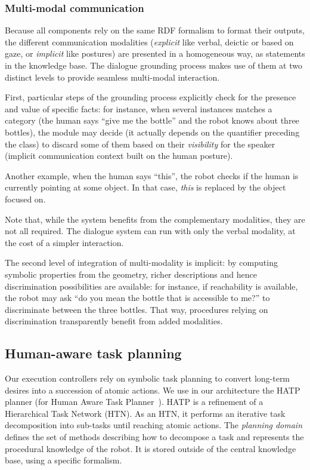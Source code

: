 \documentclass[preprint,3p,times]{elsarticle}
\begin{document}
\subsubsection{Multi-modal communication}

Because all components rely on the same RDF formalism to format their outputs,
the different communication modalities (\emph{explicit} like verbal, deictic or
based on gaze, or \emph{implicit} like postures) are presented in a homogeneous
way, as statements in the knowledge base. The dialogue grounding process makes
use of them at two distinct levels to provide seamless multi-modal interaction.

First, particular steps of the grounding process explicitly check for the
presence and value of specific facts: for instance, when several instances
matches a category (the human says ``give me the bottle'' and the robot knows
about three bottles), the module may decide (it actually depends on the
quantifier preceding the class) to discard some of them based on their
\emph{visibility} for the speaker (implicit communication context built on the
human posture).

Another example, when the human says ``this'', the robot checks if the human is
currently pointing at some object. In that case, \emph{this} is replaced by the
object focused on.

Note that, while the system benefits from the complementary modalities, they
are not all required. The dialogue system can run with only the verbal
modality, at the cost of a simpler interaction.

The second level of integration of multi-modality is implicit: by computing
symbolic properties from the geometry, richer descriptions and hence
discrimination possibilities are available: for instance, if reachability is
available, the robot may ask ``do you mean the bottle that is accessible to
me?'' to discriminate between the three bottles. That way, procedures relying
on discrimination transparently benefit from added modalities.


\subsection{Human-aware task planning}

Our execution controllers rely on symbolic task planning to convert long-term
desires into a succession of atomic actions. We use in our architecture the
HATP planner (for Human Aware Task Planner~\cite{Alili2008, Alili2009}).  HATP
is a refinement of a Hierarchical Task Network (HTN). As an HTN, it performs an
iterative task decomposition into sub-tasks until reaching atomic actions. The
\emph{planning domain} defines the set of methods describing how to decompose a
task and represents the procedural knowledge of the robot. It is stored outside
of the central knowledge base, using a specific formalism.
\end{document}
